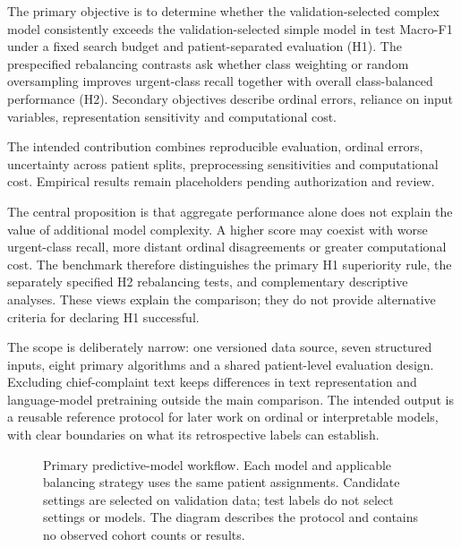 The primary objective is to determine whether the validation-selected complex
model consistently exceeds the validation-selected simple model in test
Macro-F1 under a fixed search budget and patient-separated evaluation (H1).
The prespecified rebalancing contrasts ask whether class weighting or random
oversampling improves urgent-class recall together with overall
class-balanced performance (H2). Secondary objectives describe ordinal errors,
reliance on input variables, representation sensitivity and computational cost.

The intended contribution combines reproducible evaluation, ordinal errors,
uncertainty across patient splits, preprocessing sensitivities and computational
cost. Empirical results remain placeholders pending authorization and review.

The central proposition is that aggregate performance alone does not explain
the value of additional model complexity. A higher score may coexist with
worse urgent-class recall, more distant ordinal disagreements or greater
computational cost. The benchmark therefore distinguishes the primary H1
superiority rule, the separately specified H2 rebalancing tests, and
complementary descriptive analyses. These views explain the comparison;
they do not provide alternative criteria for declaring H1 successful.

The scope is deliberately narrow: one versioned data source, seven structured
inputs, eight primary algorithms and a shared patient-level evaluation
design. Excluding chief-complaint text keeps differences in text representation and
language-model pretraining outside the main comparison. The intended output
is a reusable reference protocol for later work on ordinal or interpretable
models, with clear boundaries on what its retrospective labels can establish.

\begin{figure}[t]
\centering

\caption{Primary predictive-model workflow. Each model and applicable balancing strategy
uses the same patient assignments. Candidate settings are selected on
validation data; test labels do not select settings or models. The diagram
describes the protocol and contains no observed cohort counts or results.}
\label{fig:flow}
\end{figure}

